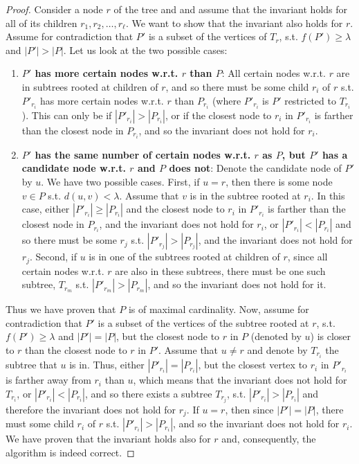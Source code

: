\documentclass[a4paper,UKenglish]{lipics-v2016}
\theoremstyle{plain}
\begin{document}
\begin{proof}
Consider a node $r$ of the tree and and assume that the invariant holds for all of its children $r_{1},r_{2},\ldots,r_{\ell}$.
We want to show that the invariant also holds for $r$.
Assume for contradiction that $P'$ is a subset of the vertices of $T_r$, s.t. $f(P')\geq\lambda$ and $|P'| > |P|$. Let us look at the two possible cases:
\begin{enumerate}
\item \textbf{\boldmath$P'$ has more certain nodes w.r.t. \boldmath$r$ than \boldmath$P$}: All certain nodes w.r.t. $r$ are in subtrees rooted at children of $r$, and so there must be some child $r_{i}$ of $r$ s.t. $P'_{r_i}$ has more certain nodes w.r.t. $r$ than $P_{r_i}$ (where $P'_{r_i}$ is $P'$ restricted to $T_{r_i}$). This can only be if $|P'_{r_i}| > |P_{r_i}|$, or if the closest node to $r_i$ in $P'_{r_i}$ is farther than the closest node in $P_{r_i}$, and so the invariant does not hold for $r_i$.
\item \textbf{\boldmath$P'$ has the same number of certain nodes w.r.t. \boldmath$r$ as \boldmath$P$, but \boldmath$P'$ has a candidate node w.r.t. \boldmath$r$  and \boldmath$P$ does not}: Denote the candidate node of $P'$ by $u$. We have two possible cases. First, if $u=r$, then there is some node $v \in P$ s.t. $d(u,v)<\lambda$. Assume that $v$ is in the subtree rooted at $r_i$. In this case, either $|P'_{r_i}| \geq |P_{r_i}|$ and the closest node to $r_i$ in $P'_{r_i}$ is farther than the closest node in $P_{r_i}$, and the invariant does not hold for $r_i$, or $|P'_{r_i}|<|P_{r_i}|$ and so there must be some $r_j$ s.t. $|P'_{r_j}|>|P_{r_j}|$, and the invariant does not hold for $r_j$. Second, if $u$ is in one of the subtrees rooted at children of $r$, since all certain nodes w.r.t. $r$ are also in these subtrees, there must be one such subtree, $T_{r_m}$ s.t. $|P'_{r_m}| > |P_{r_m}|$, and so the invariant does not hold for it.
\end{enumerate} 
Thus we have proven that $P$ is of maximal cardinality. Now, assume for contradiction that $P'$ is a subset of the vertices of the subtree rooted at $r$, s.t. $f(P')\geq\lambda$ and $|P'| = |P|$, but the closest node to $r$ in $P$ (denoted by $u$) is closer to $r$ than the closest node to $r$ in $P'$. Assume that $u \neq r$ and denote by $T_{r_i}$ the subtree that $u$ is in. Thus, either $|P'_{r_i}| = |P_{r_i}|$, but the closest vertex to $r_i$ in $P'_{r_i}$ is farther away from $r_i$ than $u$, which means that the invariant does not hold for $T_{r_i}$, or $|P'_{r_i}| < |P_{r_i}|$, and so there exists a subtree $T_{r_j}$, s.t. $|P'_{r_i}| > |P_{r_i}|$ and therefore the invariant does not hold for $r_j$. If $u=r$, then since $|P'| = |P|$, there must some child $r_{i}$ of $r$ s.t. $|P'_{r_i}| > |P_{r_i}|$, and so the invariant does not hold for $r_i$. We have proven that the invariant holds also for $r$ and, consequently, the algorithm is indeed correct.
\end{proof}
\basicpartitioninglemma*
\end{document}
